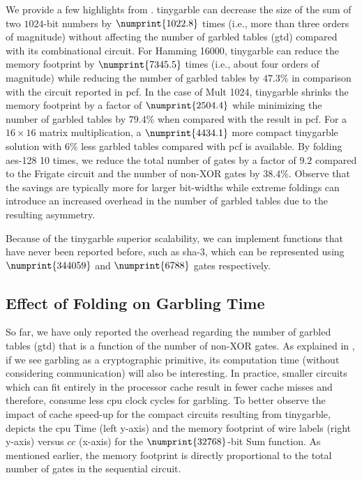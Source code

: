 We provide a few highlights from .
\gls{tinygarble} can decrease the size of the sum of two $1024$-bit numbers by $\numprint{1022.8}$ times (i.e., more than three orders of magnitude) without affecting the number of garbled tables (\acrshort{gtd}) compared with its combinational circuit.
For Hamming 16000, \gls{tinygarble} can reduce the memory footprint by $\numprint{7345.5}$ times (i.e., about four orders of magnitude) while reducing the number of garbled tables by $47.3\%$ in comparison with the circuit reported in \gls{pcf}.
In the case of Mult 1024, \gls{tinygarble} shrinks the memory footprint by a factor of $\numprint{2504.4}$ while minimizing the number of garbled tables by $79.4\%$ when compared with the result in \gls{pcf}.
For a $16\times 16$ matrix multiplication, a $\numprint{4434.1}$ more compact \gls{tinygarble} solution with $6\%$ less garbled tables compared with \gls{pcf} is available.
By folding \acrshort{aes}-128 10 times, we reduce the total number of gates by a factor of $9.2$ compared to the Frigate circuit and the number of non-XOR gates by $38.4\%$.
Observe that the savings are typically more for larger bit-widths while extreme foldings can introduce an increased overhead in the number of garbled tables due to the resulting asymmetry.

Because of the \gls{tinygarble} superior scalability, we can implement functions that have never been reported before, such as \acrshort{sha}-3, which can be represented using $\numprint{344059}$ and $\numprint{6788}$ gates respectively.

\subsection{Effect of Folding on Garbling Time} \label{ssec:eval-tinygarble-timing}
So far, we have only reported the overhead regarding the number of garbled tables (\acrshort{gtd}) that is a function of the number of non-XOR gates.
As explained in \cite{bellare2013efficient}, if we see garbling as a cryptographic primitive, its computation time (without considering communication) will also be interesting.
In practice, smaller circuits which can fit entirely in the processor cache result in fewer cache misses and therefore, consume less \acrshort{cpu} clock cycles for garbling.
To better observe the impact of cache speed-up for the compact circuits resulting from \gls{tinygarble},  depicts the \acrshort{cpu} Time (left y-axis) and the memory footprint of wire labels (right y-axis) versus $cc$ (x-axis) for the $\numprint{32768}$-bit Sum function.
As mentioned earlier, the memory footprint is directly proportional to the total number of gates in the sequential circuit.

